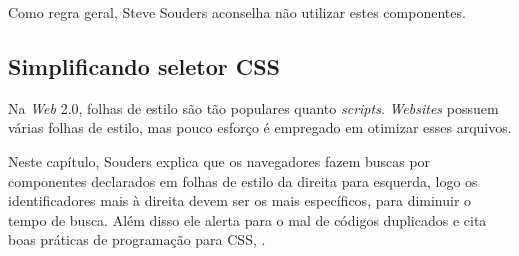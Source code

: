 Como regra geral, Steve Souders aconselha não utilizar estes componentes.

\subsection{Simplificando seletor CSS}
\label{subsec:evenfaster_cap14}
Na \textit{Web} 2.0, folhas de estilo são tão populares quanto \textit{scripts}. \textit{Websites} possuem várias folhas de estilo, mas pouco esforço é empregado em otimizar esses arquivos.

Neste capítulo, Souders explica que os navegadores fazem buscas por componentes declarados em folhas de estilo da direita para esquerda, logo os identificadores mais à direita devem ser os mais específicos, para diminuir o tempo de busca. Além disso ele alerta para o mal de códigos duplicados e cita boas práticas de programação para CSS, \cite[p.~195]{EvenFaster}.
